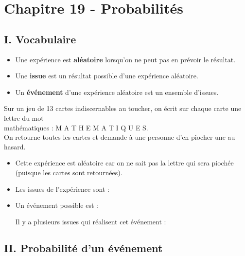 \section*{Chapitre 19 - Probabilités}
 
\subsection*{I. Vocabulaire}

\begin{Définitions*}[c]
\leavevmode\vspace{-\baselineskip}
\begin{itemize}[label=\textcolor{Couleur6}{$\bullet$}]
\item Une expérience est \textbf{aléatoire} lorsqu'on ne peut pas en prévoir le résultat.
\item Une \textbf{issue} est un résultat possible d'une expérience aléatoire.
\item Un \textbf{événement} d'une expérience aléatoire est un ensemble d'issues.
\end{itemize}
\end{Définitions*}


\begin{Exemple}  Sur un jeu de 13 cartes indiscernables au toucher, on écrit sur chaque carte une lettre du mot \\
\og mathématiques \fg{} : M A T H E M A T I Q U E S. \\
On retourne toutes les cartes et demande à une personne d'en piocher une au hasard.
\begin{itemize}[label=\textcolor{Couleur8}{$\bullet$}]
\item Cette expérience est aléatoire car on ne sait pas la lettre qui sera piochée (puisque les cartes sont retournées).
\item Les issues de l'expérience sont : \ligne

\item Un événement possible est : \ligne 

Il y a plusieurs issues qui réalisent cet événement : \ligne

\end{itemize}
\end{Exemple}

\vspace{-0.2cm}

\subsection*{II. Probabilité d'un événement}



